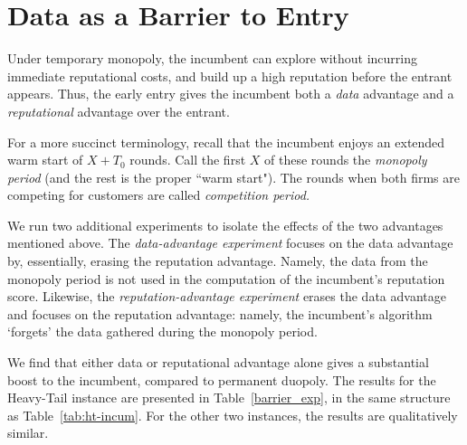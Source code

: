 \documentclass[../competing_bandits_with_appendix.tex]{subfiles}
\begin{document}
\section{Data as a Barrier to Entry}\label{section:6}



Under temporary monopoly, the incumbent can explore without incurring immediate reputational costs, and build up a high reputation before the entrant appears. Thus, the early entry gives the incumbent both a \textit{data} advantage and a \textit{reputational} advantage over the entrant.   

For a more succinct terminology, recall that the incumbent enjoys an extended warm start of $X+T_0$ rounds. Call the first $X$ of these rounds the \emph{monopoly period} (and the rest is the proper ``warm start"). The rounds when both firms are competing for customers are called \emph{competition period.}

We run two additional experiments to isolate the effects of the two
advantages mentioned above. The \emph{data-advantage experiment} focuses on the data advantage by, essentially, erasing the reputation advantage. Namely, the data from the monopoly period is not used in the computation of the incumbent's reputation score. Likewise, the \emph{reputation-advantage experiment} erases the data advantage and focuses on the reputation advantage: namely, the incumbent's algorithm `forgets' the data gathered during the monopoly period.

We find that either data or reputational advantage alone gives a substantial boost to the incumbent, compared to permanent duopoly. The results for the Heavy-Tail instance are presented in Table~\ref{barrier_exp}, in the same structure as Table~\ref{tab:ht-incum}. For the other two instances, the results are qualitatively similar.
\end{document}
